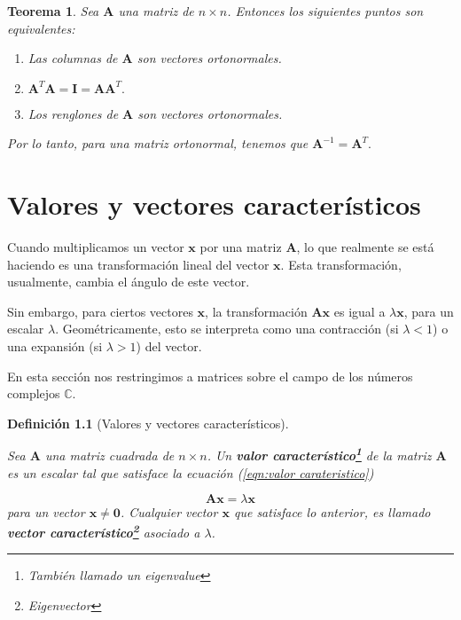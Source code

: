 \documentclass[11pt]{report}
\theoremstyle{break}
\newtheorem{definicion}{Definición}[chapter]
\newtheorem{teorema}{Teorema}[chapter]
\theoremstyle{break}
\newcommand{\matdim}[2]{$#1 \times #2$}
\begin{document}
\begin{teorema}
Sea $\bm{A}$ una matriz de \matdim{n}{n}. Entonces los siguientes puntos son equivalentes:

\begin{enumerate}[label=\roman*)]
\item Las columnas de $\bm{A}$ son vectores ortonormales.
\item $\bm{A}^{T} \bm{A} = \bm{I} = \bm{A} \bm{A}^{T}.$
\item Los renglones de $\bm{A}$ son vectores ortonormales.
\end{enumerate}

Por lo tanto, para una matriz ortonormal, tenemos que $\bm{A}^{-1} = \bm{A}^{T}.$
\end{teorema}

\chapter{Valores y vectores característicos}
\label{chapter:eigen}
Cuando multiplicamos un vector $\bm{x}$ por una matriz $\bm{A}$, lo que realmente se está haciendo es una transformación lineal del vector $\bm{x}$. Esta transformación, usualmente, cambia el ángulo de este vector.

Sin embargo, para ciertos vectores  $\bm{x}$, la transformación $\bm{A} \bm{x}$ es igual a $\lambda \bm{x}$, para un escalar $\lambda$. Geométricamente, esto se interpreta como una contracción (si $\lambda < 1$) o una expansión (si $\lambda >1$) del vector.

En esta sección nos restringimos a matrices sobre el campo de los números complejos $\mathbb{C}$.

\begin{definicion}[Valores y vectores característicos]
\label{definicion:eigenvalues eigenvectors}

Sea $\bm{A}$ una matriz cuadrada de \matdim{n}{n}. Un \textbf{valor característico\footnote{También llamado un eigenvalue}} de la matriz $\bm{A}$ es un escalar tal que satisface la ecuación (\ref{eqn:valor carateristico})

\begin{equation}
\bm{Ax} = \lambda \bm{x} \label{eqn:valor carateristico}
\end{equation}
para un vector $\bm{x} \neq \bm{0}$. Cualquier vector $\bm{x}$ que satisface lo anterior, es llamado \textbf{vector característico\footnote{Eigenvector}} asociado a $\lambda$.
\end{definicion}
\end{document}
